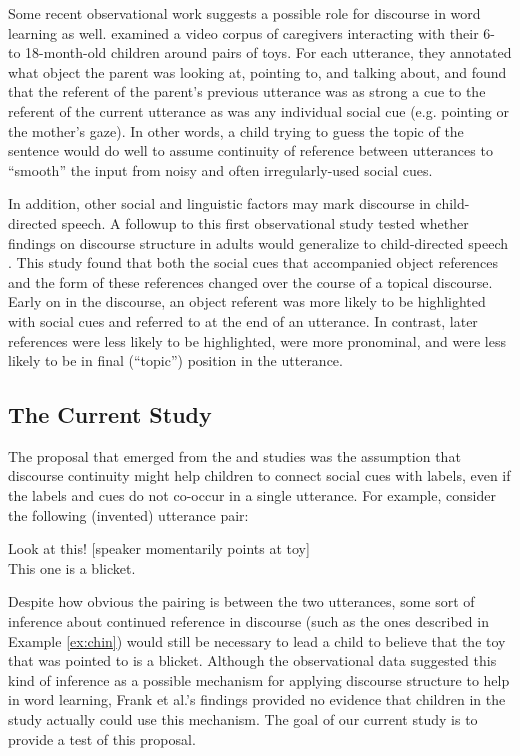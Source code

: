 \documentclass[man]{apa2}
\begin{document}
Some recent observational work suggests a possible role for discourse in word learning as well.  examined a video corpus of caregivers interacting with their 6- to 18-month-old children around pairs of toys. For each utterance, they annotated what object the parent was looking at, pointing to, and talking about, and found that the referent of the parent's previous utterance was as strong a cue to the referent of the current utterance as was any individual social cue (e.g. pointing or the mother's gaze). In other words, a child trying to guess the topic of the sentence would do well to assume continuity of reference between utterances to ``smooth'' the input from noisy and often irregularly-used social cues.

In addition, other social and linguistic factors may mark discourse in child-directed speech. A followup to this first observational study tested whether findings on discourse structure in adults would generalize to child-directed speech \cite{rohdeunderreview}. This study found that both the social cues that accompanied object references and the form of these references changed over the course of a topical discourse. Early on in the discourse, an object referent was more likely to be highlighted with social cues and referred to at the end of an utterance. In contrast, later references were less likely to be highlighted, were more pronominal, and were less likely to be in final (``topic'') position in the utterance. 

\subsection{The Current Study}

The proposal that emerged from the  and  studies was the assumption that discourse continuity might help children to connect social cues with labels, even if the labels and cues do not co-occur in a single utterance.  For example, consider the following (invented) utterance pair:

\begin{example}
\label{ex:blicket}
Look at this! [speaker momentarily points at toy] \\
This one is a blicket.
\end{example}

\noindent Despite how obvious the pairing is between the two utterances, some sort of inference about continued reference in discourse (such as the ones described in Example \ref{ex:chin}) would still be necessary to lead a child to believe that the toy that was pointed to is a blicket.  Although the observational data suggested this kind of inference as a possible mechanism for applying discourse structure to help in word learning, Frank et al.'s findings provided no evidence that children in the study actually could use this mechanism.  The goal of our current study is to provide a test of this proposal. 
\end{document}
